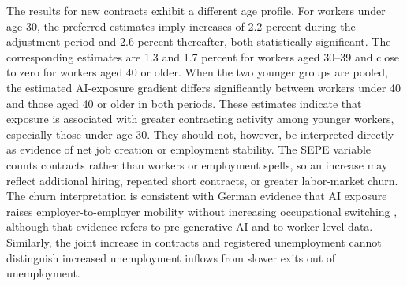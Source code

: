 


The results for new contracts exhibit a different age profile. For workers under age 30, the preferred estimates imply increases of 2.2 percent during the adjustment period and 2.6 percent thereafter, both statistically significant. The corresponding estimates are 1.3 and 1.7 percent for workers aged 30--39 and close to zero for workers aged 40 or older. When the two younger groups are pooled, the estimated AI-exposure gradient differs significantly between workers under 40 and those aged 40 or older in both periods. These estimates indicate that exposure is associated with greater contracting activity among younger workers, especially those under age 30. They should not, however, be interpreted directly as evidence of net job creation or employment stability. The SEPE variable counts contracts rather than workers or employment spells, so an increase may reflect additional hiring, repeated short contracts, or greater labor-market churn. The churn interpretation is consistent with German evidence that AI exposure raises employer-to-employer mobility without increasing occupational switching \citep{gathmann2024ai}, although that evidence refers to pre-generative AI and to worker-level data. Similarly, the joint increase in contracts and registered unemployment cannot distinguish increased unemployment inflows from slower exits out of unemployment.

